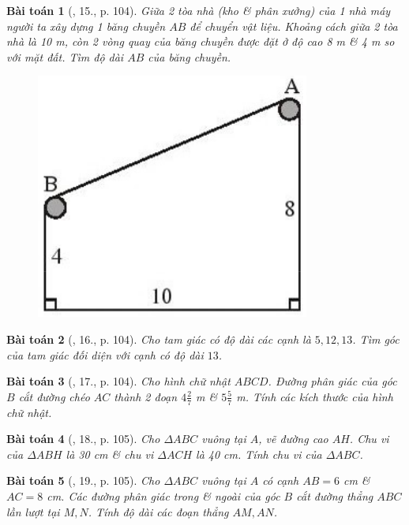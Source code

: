 \documentclass{article}
\newtheorem{baitoan}{Bài toán}
\begin{document}
\begin{baitoan}[\cite{SBT_Toan_9_tap_1}, 15., p. 104]
	Giữa 2 tòa nhà (kho \& phân xưởng) của 1 nhà máy người ta xây dựng 1 băng chuyền $AB$ để chuyển vật liệu. Khoảng cách giữa 2 tòa nhà là {\rm10 m}, còn 2 vòng quay của băng chuyền được đặt ở độ cao {\rm 8 m} \& {\rm 4 m} so với mặt đất. Tìm độ dài $AB$ của băng chuyền.
	\begin{figure}[H]
		\centering
		\includegraphics[scale=.25]{SBT_Toan_9_7_p104}
	\end{figure}
\end{baitoan}

\begin{baitoan}[\cite{SBT_Toan_9_tap_1}, 16., p. 104]
	Cho tam giác có độ dài các cạnh là $5,12,13$. Tìm góc của tam giác đối diện với cạnh có độ dài $13$.
\end{baitoan}

\begin{baitoan}[\cite{SBT_Toan_9_tap_1}, 17., p. 104]
	Cho hình chữ nhật $ABCD$. Đường phân giác của góc $B$ cắt đường chéo $AC$ thành 2 đoạn $4\frac{2}{7}$ {\rm m} \& $5\frac{5}{7}$ {\rm m}. Tính các kích thước của hình chữ nhật.
\end{baitoan}

\begin{baitoan}[\cite{SBT_Toan_9_tap_1}, 18., p. 105]
	Cho $\Delta ABC$ vuông tại $A$, vẽ đường cao $AH$. Chu vi của $\Delta ABH$ là {\rm30 cm} \& chu vi $\Delta ACH$ là {\rm40 cm}. Tính chu vi của $\Delta ABC$.
\end{baitoan}

\begin{baitoan}[\cite{SBT_Toan_9_tap_1}, 19., p. 105]
	Cho $\Delta ABC$ vuông tại $A$ có cạnh $AB = 6$ {\rm cm} \& $AC = 8$ {\rm cm}. Các đường phân giác trong \& ngoài của góc $B$ cắt đường thẳng $ABC$ lần lượt tại $M,N$. Tính độ dài các đoạn thẳng $AM,AN$.
\end{baitoan}
\end{document}
